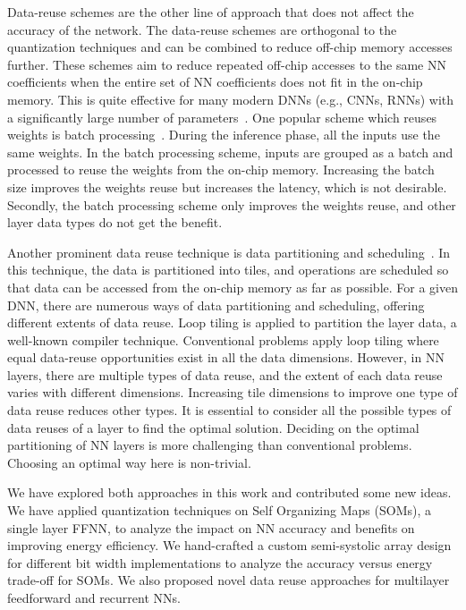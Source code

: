 Data-reuse schemes are the other line of approach that does not affect the accuracy of the network. The data-reuse schemes are orthogonal to the quantization techniques and can be combined to reduce off-chip memory accesses further. These schemes aim to reduce repeated off-chip accesses to the same NN coefficients when the entire set of NN coefficients does not fit in the on-chip memory. This is quite effective for many modern DNNs (e.g., CNNs, RNNs) with a significantly large number of parameters~\cite{zhang2015optimizing, Li2018SmartShuttleOO,que2019efficient,park2020time}. One popular scheme which reuses weights is batch processing~\cite{que2019efficient}. During the inference phase, all the inputs use the same weights. In the batch processing scheme, inputs are grouped as a batch and processed to reuse the weights from the on-chip memory. Increasing the batch size improves the weights reuse but increases the latency, which is not desirable. Secondly, the batch processing scheme only improves the weights reuse, and other layer data types do not get the benefit.

Another prominent data reuse technique is data partitioning and scheduling~\cite{zhang2015optimizing,zhang2015optimizing}. In this technique, the data is partitioned into tiles, and operations are scheduled so that data can be accessed from the on-chip memory as far as possible. For a given DNN, there are numerous ways of data partitioning and scheduling, offering different extents of data reuse. Loop tiling is applied to partition the layer data, a well-known compiler technique. Conventional problems apply loop tiling where equal data-reuse opportunities exist in all the data dimensions. However, in NN layers, there are multiple types of data reuse, and the extent of each data reuse varies with different dimensions. Increasing tile dimensions to improve one type of data reuse reduces other types. It is essential to consider all the possible types of data reuses of a layer to find the optimal solution. Deciding on the optimal partitioning of NN layers is more challenging than conventional problems. Choosing an optimal way here is non-trivial.

We have explored both approaches in this work and contributed some new ideas. We have applied quantization techniques on Self Organizing Maps (SOMs), a single layer FFNN, to analyze the impact on NN accuracy and benefits on improving energy efficiency. We hand-crafted a custom semi-systolic array design for different bit width implementations to analyze the accuracy versus energy trade-off for SOMs. We also proposed novel data reuse approaches for multilayer feedforward and recurrent NNs. 

